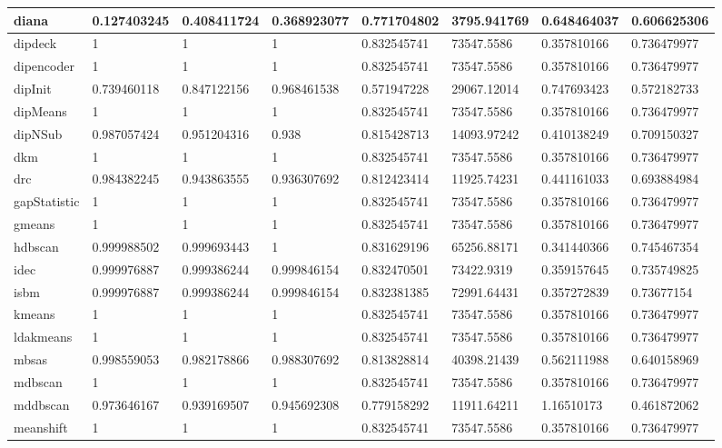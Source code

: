 \begin{table}[H]
\begin{tabular}{|l|l|l|l|l|l|l|l|}
\hline
diana & 0.127403245 & 0.408411724 & 0.368923077 & 0.771704802 & 3795.941769 & 0.648464037 & 0.606625306 \\
\hline
dipdeck & 1 & 1 & 1 & 0.832545741 & 73547.5586 & 0.357810166 & 0.736479977 \\
\hline
dipencoder & 1 & 1 & 1 & 0.832545741 & 73547.5586 & 0.357810166 & 0.736479977 \\
\hline
dipInit & 0.739460118 & 0.847122156 & 0.968461538 & 0.571947228 & 29067.12014 & 0.747693423 & 0.572182733 \\
\hline
dipMeans & 1 & 1 & 1 & 0.832545741 & 73547.5586 & 0.357810166 & 0.736479977 \\
\hline
dipNSub & 0.987057424 & 0.951204316 & 0.938 & 0.815428713 & 14093.97242 & 0.410138249 & 0.709150327 \\
\hline
dkm & 1 & 1 & 1 & 0.832545741 & 73547.5586 & 0.357810166 & 0.736479977 \\
\hline
drc & 0.984382245 & 0.943863555 & 0.936307692 & 0.812423414 & 11925.74231 & 0.441161033 & 0.693884984 \\
\hline
gapStatistic & 1 & 1 & 1 & 0.832545741 & 73547.5586 & 0.357810166 & 0.736479977 \\
\hline
gmeans & 1 & 1 & 1 & 0.832545741 & 73547.5586 & 0.357810166 & 0.736479977 \\
\hline
hdbscan & 0.999988502 & 0.999693443 & 1 & 0.831629196 & 65256.88171 & 0.341440366 & 0.745467354 \\
\hline
idec & 0.999976887 & 0.999386244 & 0.999846154 & 0.832470501 & 73422.9319 & 0.359157645 & 0.735749825 \\
\hline
isbm & 0.999976887 & 0.999386244 & 0.999846154 & 0.832381385 & 72991.64431 & 0.357272839 & 0.73677154 \\
\hline
kmeans & 1 & 1 & 1 & 0.832545741 & 73547.5586 & 0.357810166 & 0.736479977 \\
\hline
ldakmeans & 1 & 1 & 1 & 0.832545741 & 73547.5586 & 0.357810166 & 0.736479977 \\
\hline
mbsas & 0.998559053 & 0.982178866 & 0.988307692 & 0.813828814 & 40398.21439 & 0.562111988 & 0.640158969 \\
\hline
mdbscan & 1 & 1 & 1 & 0.832545741 & 73547.5586 & 0.357810166 & 0.736479977 \\
\hline
mddbscan & 0.973646167 & 0.939169507 & 0.945692308 & 0.779158292 & 11911.64211 & 1.16510173 & 0.461872062 \\
\hline
meanshift & 1 & 1 & 1 & 0.832545741 & 73547.5586 & 0.357810166 & 0.736479977 \\

\end{tabular}
\end{table}
